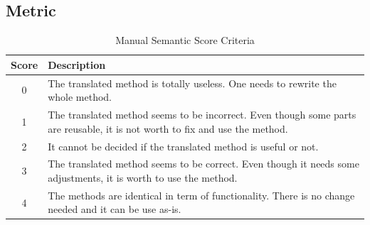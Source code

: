 \subsection{Metric}

\begin{table}
\begin{tabular}{|c|p{6.5cm}|}
\hline
Score & Description \\
\hline
0 & The translated method is totally useless. One needs to rewrite the whole method. \\
\hline
1 & The translated method seems to be incorrect. Even though some parts are reusable, it is not worth to fix and use the method. \\
\hline
2 &  It cannot be decided if the translated method is useful or not. \\
\hline
3 & The translated method seems to be correct. Even though it needs some adjustments, it is worth to use the method. \\
\hline
4 & The methods are identical in term of functionality. There is no change needed and it can be use as-is. \\
\hline
\end{tabular}
\caption{Manual Semantic Score Criteria}
\label{table:criteria}
\end{table}


